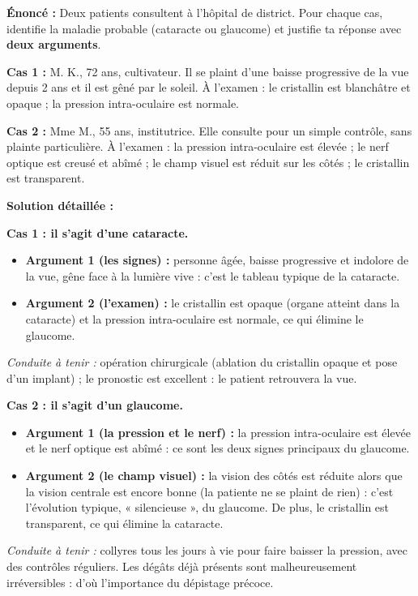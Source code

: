 \documentclass[11pt]{article}
\begin{document}
\begin{exoresolu}
\textbf{Énoncé :} Deux patients consultent à l'hôpital de district. Pour chaque cas, identifie la maladie probable (cataracte ou glaucome) et justifie ta réponse avec \textbf{deux arguments}.

\textbf{Cas 1 :} M. K., 72 ans, cultivateur. Il se plaint d'une baisse progressive de la vue depuis 2 ans et il est gêné par le soleil. À l'examen : le cristallin est blanchâtre et opaque ; la pression intra-oculaire est normale.

\textbf{Cas 2 :} Mme M., 55 ans, institutrice. Elle consulte pour un simple contrôle, sans plainte particulière. À l'examen : la pression intra-oculaire est élevée ; le nerf optique est creusé et abîmé ; le champ visuel est réduit sur les côtés ; le cristallin est transparent.

\tcblower
\textbf{Solution détaillée :}

\textbf{Cas 1 : il s'agit d'une cataracte.}
\begin{itemize}
    \item \textbf{Argument 1 (les signes) :} personne âgée, baisse progressive et indolore de la vue, gêne face à la lumière vive : c'est le tableau typique de la cataracte.
    \item \textbf{Argument 2 (l'examen) :} le cristallin est opaque (organe atteint dans la cataracte) et la pression intra-oculaire est normale, ce qui élimine le glaucome.
\end{itemize}
\textit{Conduite à tenir :} opération chirurgicale (ablation du cristallin opaque et pose d'un implant) ; le pronostic est excellent : le patient retrouvera la vue.

\textbf{Cas 2 : il s'agit d'un glaucome.}
\begin{itemize}
    \item \textbf{Argument 1 (la pression et le nerf) :} la pression intra-oculaire est élevée et le nerf optique est abîmé : ce sont les deux signes principaux du glaucome.
    \item \textbf{Argument 2 (le champ visuel) :} la vision des côtés est réduite alors que la vision centrale est encore bonne (la patiente ne se plaint de rien) : c'est l'évolution typique, « silencieuse », du glaucome. De plus, le cristallin est transparent, ce qui élimine la cataracte.
\end{itemize}
\textit{Conduite à tenir :} collyres tous les jours à vie pour faire baisser la pression, avec des contrôles réguliers. Les dégâts déjà présents sont malheureusement irréversibles : d'où l'importance du dépistage précoce.
\end{exoresolu}
\end{document}
